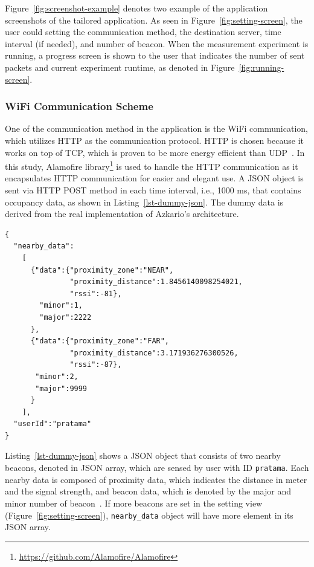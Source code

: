 \documentclass[journal]{vgtc}                %
\begin{document}
Figure~\ref{fig:screenshot-example} denotes two example of the application screenshots of the tailored application. As seen in Figure~\ref{fig:setting-screen}, the user could setting the communication method, the destination server, time interval (if needed), and number of beacon. When the measurement experiment is running, a progress screen is shown to the user that indicates the number of sent packets and current experiment runtime, as denoted in Figure~\ref{fig:running-screen}.

\subsubsection{WiFi Communication Scheme} %
\label{ssub:wifi_communication_scheme}
One of the communication method in the application is the WiFi communication, which utilizes HTTP as the communication protocol. HTTP is chosen because it works on top of TCP, which is proven to be more energy efficient than UDP~\cite{Trestian2012}. In this study, Alamofire library\footnote{\url{https://github.com/Alamofire/Alamofire}} is used to handle the HTTP communication as it encapsulates HTTP communication for easier and elegant use. A JSON object is sent via HTTP POST method in each time interval, i.e., 1000 ms, that contains occupancy data, as shown in Listing~\ref{lst-dummy-json}. The dummy data is derived from the real implementation of Azkario's architecture.

\begin{lstlisting}[caption=Example of dummy occupancy data in JSON., label=lst-dummy-json]
{
  "nearby_data":
    [
      {"data":{"proximity_zone":"NEAR",
               "proximity_distance":1.8456140098254021,
               "rssi":-81},
        "minor":1,
        "major":2222
      },
      {"data":{"proximity_zone":"FAR",
               "proximity_distance":3.171936276300526,
               "rssi":-87},
       "minor":2,
       "major":9999
      }
    ],
  "userId":"pratama"
}
\end{lstlisting}

Listing~\ref{lst-dummy-json} shows a JSON object that consists of two nearby beacons, denoted in JSON array, which are sensed by user with ID \texttt{pratama}. Each nearby data is composed of proximity data, which indicates the distance in meter and the signal strength, and beacon data, which is denoted by the major and minor number of beacon~\cite{AppleInc.2014}. If more beacons are set in the setting view (Figure~\ref{fig:setting-screen}), \texttt{nearby\_data} object will have more element in its JSON array.
\end{document}
